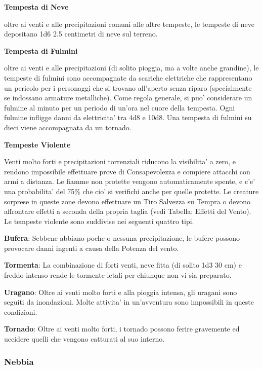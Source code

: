 \documentclass[a4paper,11pt,twoside,openany]{dndbook}
\begin{document}
{\textbf{Tempesta di Neve}

oltre ai venti e alle precipitazioni comuni alle altre tempeste, le tempeste di neve depositano 1d6 \texttimes{} 2.5 centimetri di neve sul terreno.

\textbf{Tempesta di Fulmini}

oltre ai venti e alle precipitazioni (di solito pioggia, ma a volte anche grandine), le tempeste di fulmini sono accompagnate da scariche elettriche che rappresentano un pericolo per i personaggi che si trovano all'aperto senza riparo (specialmente se indossano armature metalliche). Come regola generale, si puo' considerare un fulmine al minuto per un periodo di un'ora nel cuore della tempesta. Ogni fulmine infligge danni da elettricita' tra 4d8 e 10d8. Una tempesta di fulmini su dieci viene accompagnata da un tornado.

\textbf{Tempeste Violente}

Venti molto forti e precipitazioni torrenziali riducono la visibilita' a zero, e rendono impossibile effettuare prove di Consapevolezza e compiere attacchi con armi a distanza. Le fiamme non protette vengono automaticamente spente, e c'e' una probabilita' del 75\% che cio' si verifichi anche per quelle protette. Le creature sorprese in queste zone devono effettuare un Tiro Salvezza su Tempra o devono affrontare effetti a seconda della propria taglia (vedi Tabella: Effetti del Vento). Le tempeste violente sono suddivise nei seguenti quattro tipi.

\textbf{Bufera}: Sebbene abbiano poche o nessuna precipitazione, le bufere possono provocare danni ingenti a causa della Potenza del vento.

\textbf{Tormenta}: La combinazione di forti venti, neve fitta (di solito 1d3 \texttimes{} 30 cm) e freddo intenso rende le tormente letali per chiunque non vi sia preparato. 

\textbf{Uragano}: Oltre ai venti molto forti e alla pioggia intensa, gli uragani sono seguiti da inondazioni. Molte attivita' in un'avventura sono impossibili in queste condizioni.

\textbf{Tornado}: Oltre ai venti molto forti, i tornado possono ferire gravemente ed uccidere quelli che vengono catturati al suo interno.

\subsubsection{Nebbia}

\label{nebbia}

}
\end{document}
